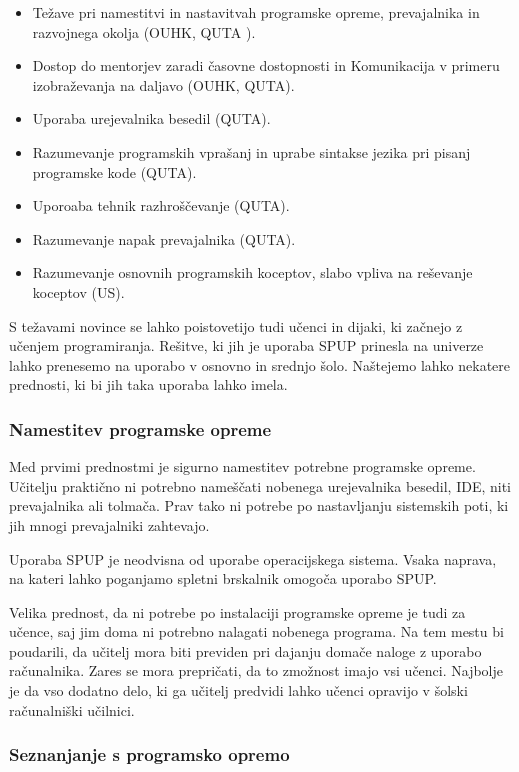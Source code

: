 \begin{itemize}
\tightlist
\item Težave pri namestitvi in nastavitvah programske opreme,
  prevajalnika in razvojnega okolja (OUHK, QUTA ).
\item Dostop do mentorjev zaradi časovne dostopnosti in Komunikacija v
  primeru izobraževanja na daljavo (OUHK, QUTA).
\item Uporaba urejevalnika besedil (QUTA).
\item Razumevanje programskih vprašanj in uprabe sintakse jezika pri
  pisanj programske kode (QUTA).
\item Uporoaba tehnik razhroščevanje (QUTA).
\item Razumevanje napak prevajalnika (QUTA).
\item Razumevanje osnovnih programskih koceptov, slabo vpliva na
  reševanje koceptov (US).
\end{itemize}

S težavami novince se lahko poistovetijo tudi učenci in dijaki, ki začnejo z
učenjem programiranja. Rešitve, ki jih je uporaba SPUP prinesla na
univerze lahko prenesemo na uporabo v osnovno in srednjo
šolo. Naštejemo lahko nekatere prednosti, ki bi jih taka uporaba lahko
imela.

\subsubsection{Namestitev programske opreme}
\label{sec:Namestitev_programske_opreme}

Med prvimi prednostmi je sigurno namestitev potrebne programske
opreme. Učitelju praktično ni potrebno nameščati nobenega urejevalnika
besedil, IDE, niti prevajalnika ali tolmača. Prav tako ni potrebe po
nastavljanju sistemskih poti, ki jih mnogi prevajalniki zahtevajo.

Uporaba SPUP je neodvisna od uporabe operacijskega sistema. Vsaka
naprava, na kateri lahko poganjamo spletni brskalnik omogoča uporabo
SPUP.

Velika prednost, da ni potrebe po instalaciji programske opreme je
tudi za učence, saj jim doma ni potrebno nalagati nobenega
programa. Na tem mestu bi poudarili, da učitelj mora biti previden pri
dajanju domače naloge z uporabo računalnika. Zares se mora prepričati,
da to zmožnost imajo vsi učenci. Najbolje je da vso dodatno delo, ki
ga učitelj predvidi lahko učenci opravijo v šolski računalniški
učilnici.

\subsubsection{Seznanjanje s programsko opremo}
\label{sec:Seznanjanje_s_prog_opremo}

